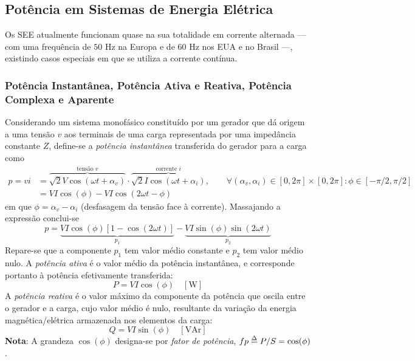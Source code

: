 \subsection{Potência em Sistemas de Energia Elétrica}
\label{subsec:power-SEE}

Os SEE atualmente funcionam quase na sua totalidade em corrente alternada --- com uma frequência de $50$ Hz na Europa e de $60$ Hz nos EUA e no Brasil ---, existindo casos especiais em que se utiliza a corrente contínua.\cite{paiva2005}

\renewcommand{\thefootnote}{\fnsymbol{footnote}}
\renewcommand{\thefootnote}{\arabic{footnote}}

\subsubsection{Potência Instantânea, Potência Ativa e Reativa, Potência Complexa e Aparente}

Considerando um sistema monofásico constituído por um gerador que dá origem a uma tensão $v$ aos terminais de uma carga representada por uma impedância constante $Z$, define-se a \textit{potência instantânea} transferida do gerador para a carga como
$$
    \begin{aligned}
        p = v i &= \overbrace{\sqrt{2}V \cos(\omega t + \alpha_v)}^{\text{tensão }v} \cdot \overbrace{\sqrt{2}I \cos(\omega t + \alpha_i)}^{\text{corrente }i}, \qquad \forall (\alpha_v, \alpha_i) \in [0,2\pi] \times [0,2\pi]: \phi \in [-\pi/2,\pi/2] \\
        &= VI \cos(\phi) - VI \cos(2\omega t - \phi)
    \end{aligned}
$$
em que $\phi = \alpha_v - \alpha_i$ (desfasagem da tensão face à corrente). Massajando a expressão conclui-se
$$
    p = \underbrace{VI \cos(\phi) [1 - \cos(2 \omega t)]}_{p_1} - \underbrace{VI \sin(\phi) \sin(2\omega t)}_{p_2}
$$
Repare-se que a componente $p_1$ tem valor médio constante e $p_2$ tem valor médio nulo. A \textit{potência ativa} é o valor médio da potência instantânea, e corresponde portanto à potência efetivamente transferida:
$$
    P = VI \cos(\phi) \quad [\text{W}]
$$
A \textit{potência reativa} é o valor máximo da componente da potência que oscila entre o gerador e a carga, cujo valor médio é nulo, resultante da variação da energia magnética/elétrica armazenada nos elementos da carga:
$$
    Q = VI \sin(\phi) \quad [\text{VAr}]
$$
\noindent \textbf{Nota}: A grandeza $\cos(\phi)$ designa-se por \textit{fator de potência}, $fp \delequal P/S = \cos(\phi)$.

